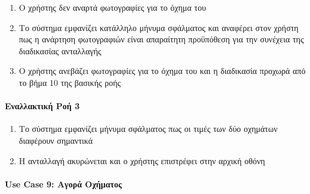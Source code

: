 \documentclass{../ol-softwaremanual}
\begin{document}
    \begin{enumerate}
    	\item Ο χρήστης δεν αναρτά φωτογραφίες για το όχημα του
    	\item Το σύστημα εμφανίζει κατάλληλο μήνυμα σφάλματος και αναφέρει στον χρήστη πως η ανάρτηση φωτογραφιών είναι απαραίτητη προϋπόθεση για την συνέχεια της διαδικασίας ανταλλαγής 
    	\item O χρήστης ανεβάζει φωτογραφίες για το όχημα του και η διαδικασία προχωρά από το βήμα 10 της βασικής ροής
    \end{enumerate}
    
    \paragraph{Εναλλακτική Ροή 3}
    \begin{enumerate}
    	\item Το σύστημα εμφανίζει μήνυμα σφάλματος πως οι τιμές των δύο οχημάτων διαφέρουν σημαντικά 
    	\item Η ανταλλαγή ακυρώνεται και ο χρήστης επιστρέφει στην αρχική οθόνη
    \end{enumerate}

	\paragraph{\en Use Case 9: \gr Αγορά Οχήματος\gr}
	
\end{document}

